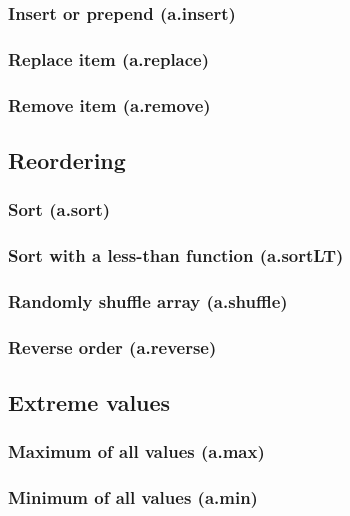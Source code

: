 \documentclass{article}
\theoremstyle{definition}
\begin{document}
\subsubsection{Insert or prepend (a.insert)}

\subsubsection{Replace item (a.replace)}

\subsubsection{Remove item (a.remove)}

\subsection{Reordering}

\subsubsection{Sort (a.sort)}

\subsubsection{Sort with a less-than function (a.sortLT)}

\subsubsection{Randomly shuffle array (a.shuffle)}

\subsubsection{Reverse order (a.reverse)}

\subsection{Extreme values}

\subsubsection{Maximum of all values (a.max)}

\subsubsection{Minimum of all values (a.min)}
\end{document}
